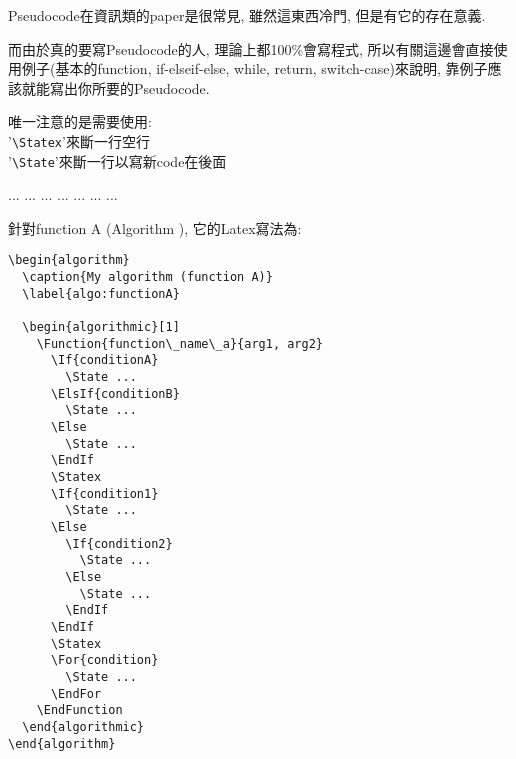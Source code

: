 
Pseudocode在資訊類的paper是很常見, 雖然這東西冷門, 但是有它的存在意義.

而由於真的要寫Pseudocode的人, 理論上都100\%會寫程式, 所以有關這邊會直接使用例子(基本的function, if-elseif-else, while, return, switch-case)來說明, 靠例子應該就能寫出你所要的Pseudocode.

唯一注意的是需要使用:\\
'\verb|\Statex|'來斷一行空行\\
'\verb|\State|'來斷一行以寫新code在後面


\newpage
\begin{algorithm}
  \caption{My algorithm (function A)}
  \label{algo:functionA}

  \begin{algorithmic}[1]
        \State ...
        \State ...
      \Else
        \State ...
      \EndIf
      \Statex
        \State ...
      \Else
          \State ...
        \Else
          \State ...
        \EndIf
      \EndIf
      \Statex
        \State ...
      \EndFor
    \EndFunction
  \end{algorithmic}
\end{algorithm}

\newpage
針對function A (Algorithm ), 它的Latex寫法為:
    \EmptyLine
\begin{fmpage}{\textwidth}
  \begin{verbatim}
\begin{algorithm}
  \caption{My algorithm (function A)}
  \label{algo:functionA}

  \begin{algorithmic}[1]
    \Function{function\_name\_a}{arg1, arg2}
      \If{conditionA}
        \State ...
      \ElsIf{conditionB}
        \State ...
      \Else
        \State ...
      \EndIf
      \Statex
      \If{condition1}
        \State ...
      \Else
        \If{condition2}
          \State ...
        \Else
          \State ...
        \EndIf
      \EndIf
      \Statex
      \For{condition}
        \State ...
      \EndFor
    \EndFunction
  \end{algorithmic}
\end{algorithm}
  \end{verbatim}
\end{fmpage}

